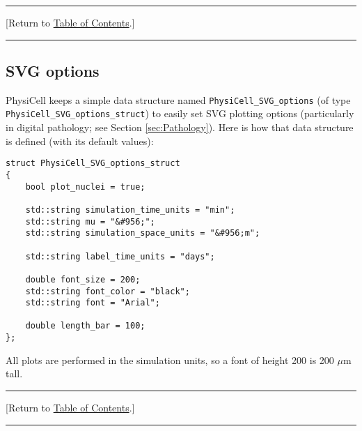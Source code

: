 \documentclass[12pt]{article}
\newcommand{\micron}{\mu\textrm{m}}
\renewcommand{\v}{\verb}
\newcommand{\blue}[1]{\textcolor{blue}{#1}}
\newcommand{\DONE}{}%
\newcommand{\TOClink}{\begin{center}\hrule\vskip-5pt\phantom{.}\hfill[Return to \hyperlink{TOC}{Table of Contents}.]\hfill\phantom{.}\vskip3pt\hrule\end{center}}
\begin{document}
\TOClink 

\subsection{SVG options \DONE}
\label{sec:SVG_options}
PhysiCell keeps a simple data structure named 
\v|PhysiCell_SVG_options| (of type \\
\v|PhysiCell_SVG_options_struct|) to easily 
set SVG plotting options (particularly in 
digital pathology; see Section \ref{sec:Pathology}). Here 
is how that data structure is defined (with its 
default values): 

\begin{verbatim}
struct PhysiCell_SVG_options_struct
{
    bool plot_nuclei = true; 

    std::string simulation_time_units = "min";
    std::string mu = "&#956;";
    std::string simulation_space_units = "&#956;m";
    
    std::string label_time_units = "days"; 
    
    double font_size = 200; 
    std::string font_color = "black";
    std::string font = "Arial";

    double length_bar = 100; 
}; 
\end{verbatim}
All plots are performed in the simulation units, so a font of height 200 
is 200 $\micron$ tall. 

\TOClink 
\end{document}
